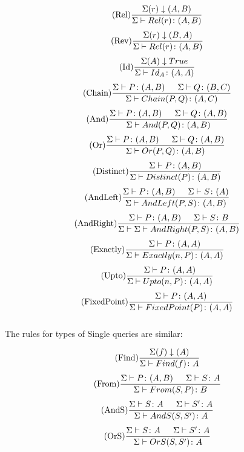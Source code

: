 \documentclass[12pt,a4paper,twoside,openright]{report}
\newcommand{\typeRule}[2]{\Sigma\vdash #1 \colon #2}
\begin{document}
\[ \begin{array}{c}
\displaystyle\mbox{(Rel)}\frac{\Sigma(r)\downarrow(A, B)}{\typeRule{Rel(r)}{(A, B)}} \\[3ex]

\displaystyle\mbox{(Rev)}\frac{\Sigma(r)\downarrow(B, A)}{\typeRule{Rel(r)}{(A, B)}} \\[3ex]

\displaystyle\mbox{(Id)}\frac{\Sigma(A)\downarrow True}{\typeRule{Id_A}{(A, A)}} \\[3ex]

\displaystyle\mbox{(Chain)}\frac{\typeRule{P}{(A, B)} \indent \typeRule{Q}{(B, C)}}{\typeRule{Chain(P, Q)}{(A, C)}} \\[3ex]

\displaystyle\mbox{(And)}\frac{\typeRule{P}{(A, B)} \indent \typeRule{Q}{(A, B)}}{\typeRule{And(P, Q)}{(A, B)}} \\[3ex]

\displaystyle\mbox{(Or)}\frac{\typeRule{P}{(A, B)} \indent \typeRule{Q}{(A, B)}}{\typeRule{Or(P, Q)}{(A, B)}} \\[3ex]

\displaystyle\mbox{(Distinct)}\frac{\typeRule{P}{(A, B)}}{\typeRule{Distinct(P)}{(A, B)}} \\[3ex]

\displaystyle\mbox{(AndLeft)}\frac{\typeRule{P}{(A, B)} \indent \typeRule{S}{(A)}}{\typeRule{AndLeft(P,S)}{(A, B)}} \\[3ex]

\displaystyle\mbox{(AndRight)}\frac{\typeRule{P}{(A, B)} \indent \typeRule{S}{B}}{\Sigma \vdash \typeRule{AndRight(P, S)}{(A, B)}} \\[3ex]

\displaystyle\mbox{(Exactly)}\frac{\typeRule{P}{(A, A)}}{\typeRule{Exactly(n, P)}{(A, A)}} \\[3ex]

\displaystyle\mbox{(Upto)}\frac{\typeRule{P}{(A, A)}}{\typeRule{Upto(n, P)}{(A, A)}} \\[3ex]

\displaystyle\mbox{(FixedPoint)}\frac{\typeRule{P}{(A, A)}}{\typeRule{FixedPoint(P)}{(A, A)}} \\[3ex]

\end{array} \]


The rules for types of Single queries are similar:

\[ \begin{array}{c}
\displaystyle\mbox{(Find)}\frac{\Sigma(f)\downarrow(A)}{\typeRule{Find(f)}{A}} \\[3ex]

\displaystyle\mbox{(From)}\frac{\typeRule{P}{(A, B)} \indent \typeRule{S}{A}}{\typeRule{From(S, P)}{B}} \\[3ex]

\displaystyle\mbox{(AndS)}\frac{  \typeRule{S}{A} \indent  \typeRule{S'}{A}}{\typeRule{AndS(S, S')}{A}} \\[3ex]

\displaystyle\mbox{(OrS)}\frac{  \typeRule{S}{A} \indent  \typeRule{S'}{A}}{\typeRule{OrS(S, S')}{A}} \\[3ex]
\end{array}
\]
\end{document}

